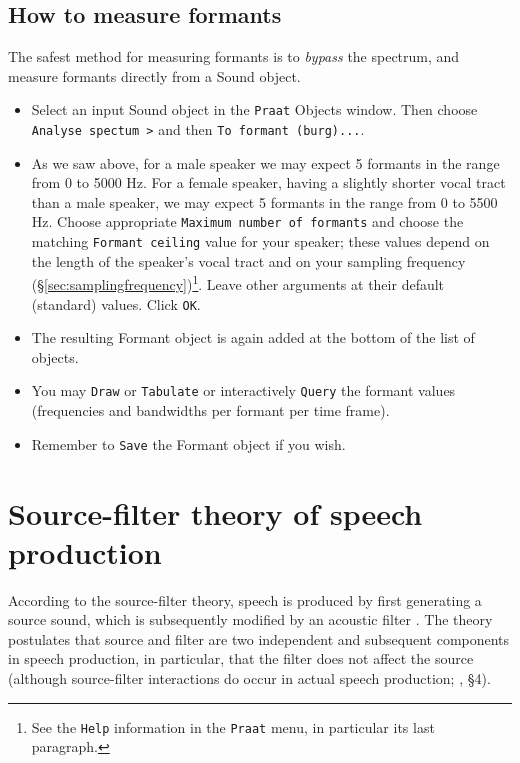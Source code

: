 \documentclass[
]{book}
\begin{document}
\subsection{How to measure formants}\label{how-to-measure-formants}

\label{box-praatformants}
The safest method for measuring formants is to \emph{bypass} the spectrum, and measure formants directly from a Sound object.

\begin{itemize}
\item
  Select an input Sound object in the \texttt{Praat} Objects window. Then choose \texttt{Analyse\ spectum\ \textgreater{}} and then \texttt{To\ formant\ (burg)...}.
\item
  As we saw above, for a male speaker we may expect 5 formants in the range from 0 to 5000 Hz. For a female speaker, having a slightly shorter vocal tract than a male speaker, we may expect 5 formants in the range from 0 to 5500 Hz. Choose appropriate \texttt{Maximum\ number\ of\ formants} and choose the matching \texttt{Formant\ ceiling} value for your speaker; these values depend on the length of the speaker's vocal tract and on your sampling frequency (§\ref{sec:samplingfrequency})\footnote{See the \texttt{Help} information in the \texttt{Praat} menu, in particular its last paragraph.}.
  Leave other arguments at their default (standard) values. Click \texttt{OK}.
\item
  The resulting Formant object is again added at the bottom of the list of objects.
\item
  You may \texttt{Draw} or \texttt{Tabulate} or interactively \texttt{Query} the formant values (frequencies and bandwidths per formant per time frame).
\item
  Remember to \texttt{Save} the Formant object if you wish.
\end{itemize}

\section{Source-filter theory of speech production}\label{sec:sourcefilter}

According to the source-filter theory, speech is produced by first generating a source sound, which is subsequently modified by an acoustic filter \citep{Fant_1970}. The theory postulates that source and filter are two independent and subsequent components in speech production, in particular, that the filter does not affect the source (although source-filter interactions do occur in actual speech production; \citet{Tokuda_2021}, §4).
\end{document}
